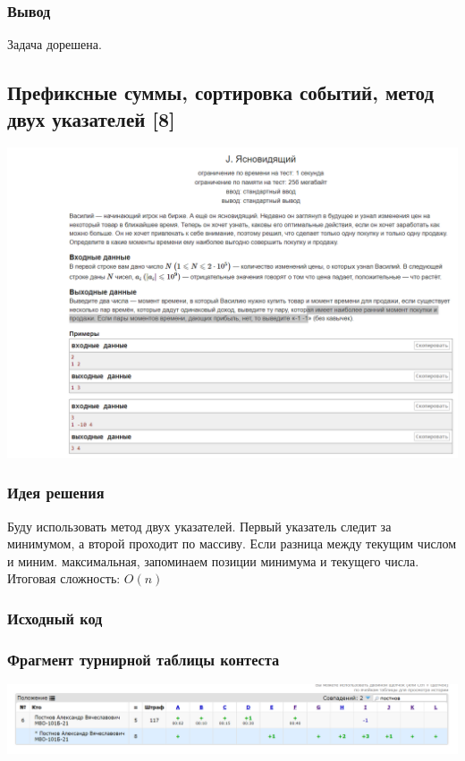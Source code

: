 \subsubsection*{Вывод}
Задача дорешена.

\vspace{20pt}

\pagebreak

\subsection*{Префиксные суммы, сортировка событий, метод двух указателей [8]}
\begin{center}
\includegraphics[width=\textwidth]{statements/8.png}
\end{center}
\subsubsection*{Идея решения}
Буду использовать метод двух указателей. Первый указатель следит за минимумом, а второй проходит по массиву. Если разница между текущим числом и миним. максимальная, запоминаем позиции минимума и текущего числа. Итоговая сложность: $O(n)$
\subsubsection*{Исходный код}


\subsubsection*{Фрагмент турнирной таблицы контеста}
\begin{center}
\includegraphics[width=\textwidth]{standings/8.png}\newline\noindent
\end{center}

